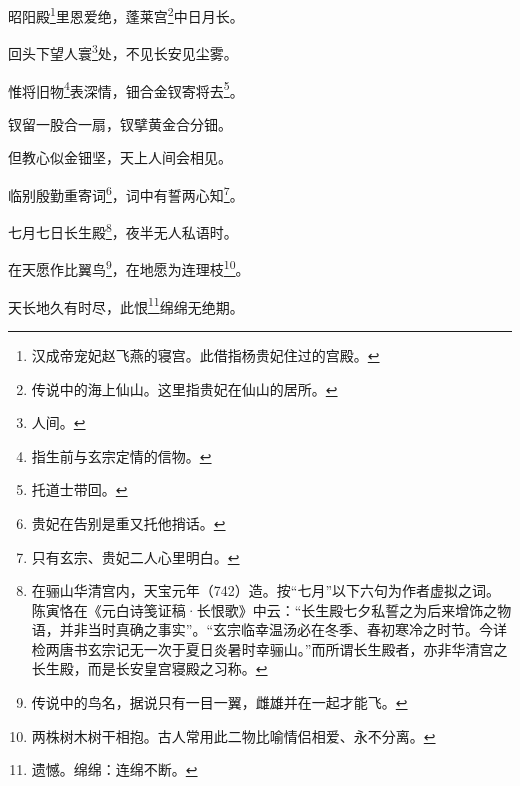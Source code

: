 \documentclass[UTF8]{ctexart}
\begin{document}
昭阳殿\footnote{汉成帝宠妃赵飞燕的寝宫。此借指杨贵妃住过的宫殿。}里恩爱绝，蓬莱宫\footnote{传说中的海上仙山。这里指贵妃在仙山的居所。}中日月长。

回头下望人寰\footnote{人间。}处，不见长安见尘雾。

惟将旧物\footnote{指生前与玄宗定情的信物。}表深情，钿合金钗寄将去\footnote{托道士带回。}。

钗留一股合一扇，钗擘黄金合分钿。

但教心似金钿坚，天上人间会相见。

临别殷勤重寄词\footnote{贵妃在告别是重又托他捎话。}，词中有誓两心知\footnote{只有玄宗、贵妃二人心里明白。}。

七月七日长生殿\footnote{在骊山华清宫内，天宝元年（742）造。按“七月”以下六句为作者虚拟之词。陈寅恪在《元白诗笺证稿·长恨歌》中云：“长生殿七夕私誓之为后来增饰之物语，并非当时真确之事实”。“玄宗临幸温汤必在冬季、春初寒冷之时节。今详检两唐书玄宗记无一次于夏日炎暑时幸骊山。”而所谓长生殿者，亦非华清宫之长生殿，而是长安皇宫寝殿之习称。}，夜半无人私语时。

在天愿作比翼鸟\footnote{传说中的鸟名，据说只有一目一翼，雌雄并在一起才能飞。}，在地愿为连理枝\footnote{两株树木树干相抱。古人常用此二物比喻情侣相爱、永不分离。}。

天长地久有时尽，此恨\footnote{遗憾。绵绵：连绵不断。}绵绵无绝期。
\end{document}
